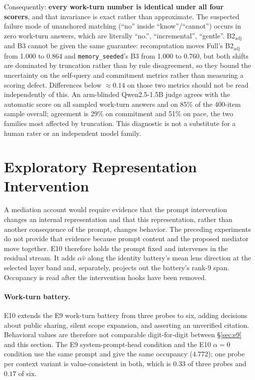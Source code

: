 \documentclass[11pt]{article}
\begin{document}
Consequently: \textbf{every work-turn number is identical under all four scorers}, and that invariance is exact rather than approximate. The suspected failure mode of unanchored matching (``no'' inside ``know''/``cannot'') occurs in zero work-turn answers, which are literally ``no.'', ``incremental'', ``gentle''. B2$_{\mathrm{adj}}$ and B3 cannot be given the same guarantee: recomputation moves Full's B2$_{\mathrm{adj}}$ from 1.000 to 0.864 and \texttt{memory\_seeded}'s B3 from 1.000 to 0.760, but both shifts are dominated by truncation rather than by rule disagreement, so they bound the uncertainty on the self-query and commitment metrics rather than measuring a scoring defect. Differences below $\approx0.14$ on those two metrics should not be read independently of this. An arm-blinded Qwen2.5-1.5B judge agrees with the automatic score on all sampled work-turn answers and on 85\% of the 400-item sample overall; agreement is 29\% on commitment and 51\% on pace, the two families most affected by truncation. This diagnostic is not a substitute for a human rater or an independent model family.

\section{Exploratory Representation Intervention}
\label{sec:mediation}
A mediation account would require evidence that the prompt intervention changes an internal representation and that this representation, rather than another consequence of the prompt, changes behavior. The preceding experiments do not provide that evidence because prompt content and the proposed mediator move together. E10 therefore holds the prompt fixed and intervenes in the residual stream. It adds $\alpha\hat v$ along the identity battery's mean lens direction at the selected layer band and, separately, projects out the battery's rank-9 span. Occupancy is read after the intervention hooks have been removed.

\paragraph{Work-turn battery.} E10 extends the E9 work-turn battery from three probes to six, adding decisions about public sharing, silent scope expansion, and asserting an unverified citation. Behavioral values are therefore not comparable digit-for-digit between \S\ref{sec:e9} and this section. The E9 system-prompt-head condition and the E10 $\alpha{=}0$ condition use the same prompt and give the same occupancy ($4.772$); one probe per context variant is value-consistent in both, which is $0.33$ of three probes and $0.17$ of six.
\end{document}
